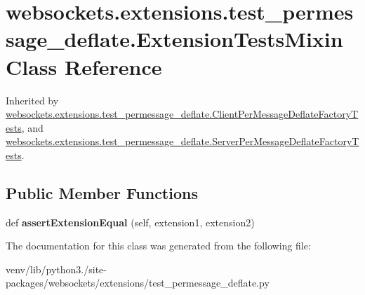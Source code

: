 \hypertarget{classwebsockets_1_1extensions_1_1test__permessage__deflate_1_1_extension_tests_mixin}{}\section{websockets.\+extensions.\+test\+\_\+permessage\+\_\+deflate.\+Extension\+Tests\+Mixin Class Reference}
\label{classwebsockets_1_1extensions_1_1test__permessage__deflate_1_1_extension_tests_mixin}


Inherited by \hyperlink{classwebsockets_1_1extensions_1_1test__permessage__deflate_1_1_client_per_message_deflate_factory_tests}{websockets.\+extensions.\+test\+\_\+permessage\+\_\+deflate.\+Client\+Per\+Message\+Deflate\+Factory\+Tests}, and \hyperlink{classwebsockets_1_1extensions_1_1test__permessage__deflate_1_1_server_per_message_deflate_factory_tests}{websockets.\+extensions.\+test\+\_\+permessage\+\_\+deflate.\+Server\+Per\+Message\+Deflate\+Factory\+Tests}.

\subsection*{Public Member Functions}
\begin{DoxyCompactItemize}
\item 
\mbox{\label{classwebsockets_1_1extensions_1_1test__permessage__deflate_1_1_extension_tests_mixin_ae1c12aaa3d861994579fac62f42f2ae5}} 
def {\bfseries assert\+Extension\+Equal} (self, extension1, extension2)
\end{DoxyCompactItemize}


The documentation for this class was generated from the following file\+:\begin{DoxyCompactItemize}
\item 
venv/lib/python3./site-\/packages/websockets/extensions/test\+\_\+permessage\+\_\+deflate.\+py\end{DoxyCompactItemize}
